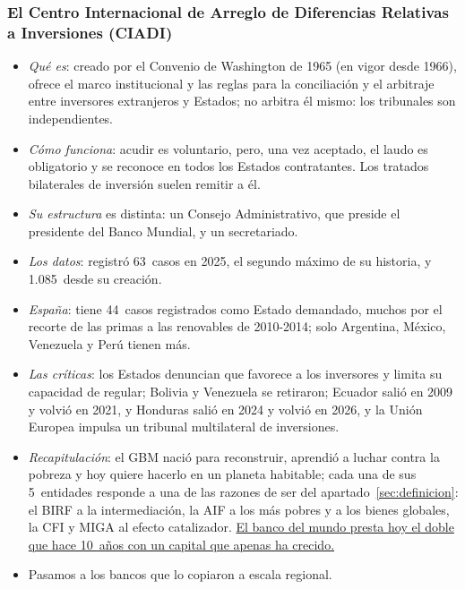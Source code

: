 \documentclass[11pt]{article}
\begin{document}
\subsubsection{El Centro Internacional de Arreglo de Diferencias Relativas a Inversiones (CIADI)}\label{sec:ciadi}

\begin{itemize}
\item \emph{Qué es}: creado por el Convenio de Washington de 1965 (en vigor desde 1966), ofrece el marco institucional y las reglas para la conciliación y el arbitraje entre inversores extranjeros y Estados; no arbitra él mismo: los tribunales son independientes.
\item \emph{Cómo funciona}: acudir es voluntario, pero, una vez aceptado, el laudo es obligatorio y se reconoce en todos los Estados contratantes. Los tratados bilaterales de inversión suelen remitir a él.
\item \emph{Su estructura} es distinta: un Consejo Administrativo, que preside el presidente del Banco Mundial, y un secretariado.
\item \emph{Los datos}: registró 63~casos en 2025, el segundo máximo de su historia, y 1.085~desde su creación\nocite{CIADI2026Casos}.
\item \emph{España}: tiene 44~casos registrados como Estado demandado, muchos por el recorte de las primas a las renovables de 2010-2014; solo Argentina, México, Venezuela y Perú tienen más\nocite{CIADI2026BaseCasos}.
\item \emph{Las críticas}: los Estados denuncian que favorece a los inversores y limita su capacidad de regular; Bolivia y Venezuela se retiraron; Ecuador salió en 2009 y volvió en 2021, y Honduras salió en 2024 y volvió en 2026, y la Unión Europea impulsa un tribunal multilateral de inversiones.
\end{itemize}

\begin{itemize}
\item \emph{Recapitulación}: el GBM nació para reconstruir, aprendió a luchar contra la pobreza y hoy quiere hacerlo en un planeta habitable; cada una de sus 5~entidades responde a una de las razones de ser del apartado~\ref{sec:definicion}: el BIRF a la intermediación, la AIF a los más pobres y a los bienes globales, la CFI y MIGA al efecto catalizador. \uline{El banco del mundo presta hoy el doble que hace 10~años con un capital que apenas ha crecido.}
\item Pasamos a los bancos que lo copiaron a escala regional.
\end{itemize}
\end{document}
